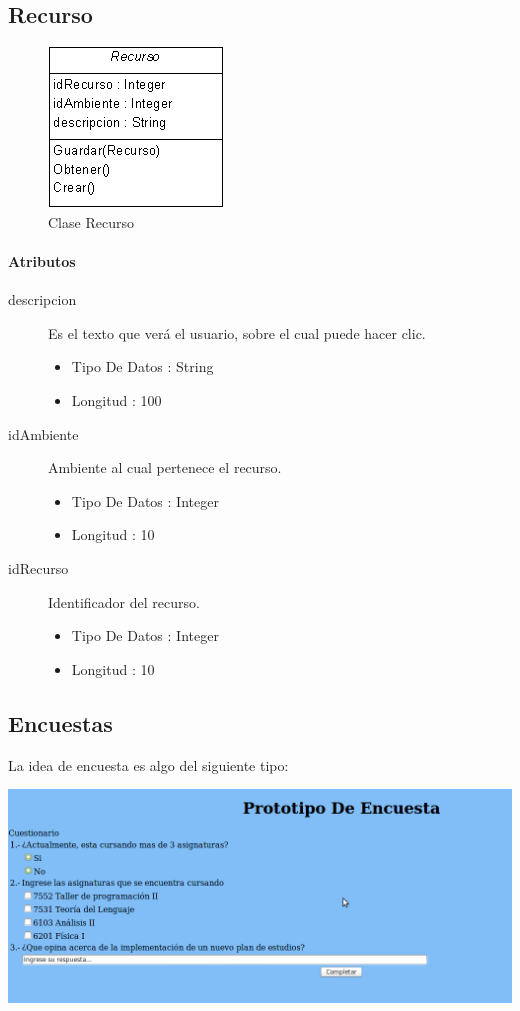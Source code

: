 \documentclass{article}
\begin{document}
\subsection{Recurso}
\begin{figure}[H]
\centering
\includegraphics[scale=0.9]{recurso}

\caption{Clase Recurso}
\end{figure}
\paragraph{\large{Atributos}}
\begin{description} 
\item[descripcion] Es el texto que ver\'a el usuario, sobre el cual puede hacer clic. \
\begin{itemize}
\item Tipo De Datos : String
\item Longitud : 100
\end{itemize}
\item[idAmbiente] Ambiente al cual pertenece el recurso.\
\begin{itemize}
\item Tipo De Datos : Integer
\item Longitud : 10
\end{itemize}
\item[idRecurso] Identificador del recurso.\
\begin{itemize}
\item Tipo De Datos : Integer
\item Longitud : 10
\end{itemize}
\end{description}
\subsection{Encuestas}
La idea de encuesta es algo del siguiente tipo:

\includegraphics[scale=0.4]{EncuestaFoto.png}	
\end{document}
